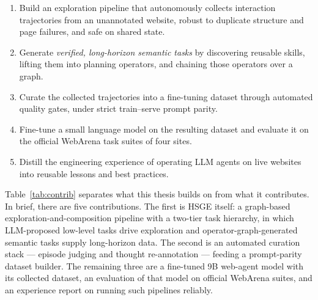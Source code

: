 \begin{enumerate}
  \item[\textbf{O1.}] Build an exploration pipeline that autonomously
  collects interaction trajectories from an unannotated website, robust to
  duplicate structure and page failures, and safe on shared state.
  \item[\textbf{O2.}] Generate \emph{verified, long-horizon semantic tasks}
  by discovering reusable skills, lifting them into planning operators, and
  chaining those operators over a graph.
  \item[\textbf{O3.}] Curate the collected trajectories into a fine-tuning
  dataset through automated quality gates, under strict train--serve prompt
  parity.
  \item[\textbf{O4.}] Fine-tune a small language model on the resulting
  dataset and evaluate it on the official WebArena task suites of four sites.
  \item[\textbf{O5.}] Distill the engineering experience of operating LLM
  agents on live websites into reusable lessons and best practices.
\end{enumerate}

Table~\ref{tab:contrib} separates what this thesis builds on from what it
contributes. In brief, there are five contributions. The first is HSGE
itself: a graph-based exploration-and-composition pipeline with a two-tier
task hierarchy, in which LLM-proposed low-level tasks drive exploration and
operator-graph-generated semantic tasks supply long-horizon data. The second
is an automated curation stack --- episode judging and thought re-annotation
--- feeding a prompt-parity dataset builder. The remaining three are a
fine-tuned 9B web-agent model with its collected dataset, an evaluation of
that model on official WebArena suites, and an experience report on running
such pipelines reliably.

